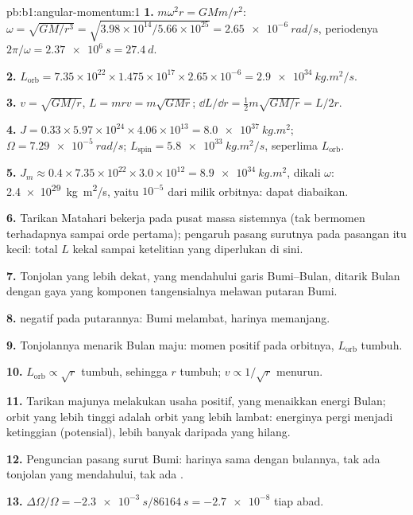 \begin{solution}{pb:b1:angular-momentum:1}
\textbf{1.} $m\omega^2r = GMm/r^2$: $\omega = \sqrt{GM/r^3} = \sqrt{3.98\times
10^{14}/5.66\times10^{25}} = \qty{2.65e-6}{rad/s}$, periodenya $2\pi/\omega =
\qty{2.37e6}{s} = \qty{27.4}{d}$.

\textbf{2.} $L_{\text{orb}} = 7.35\times10^{22} \times 1.475\times10^{17}
\times 2.65\times10^{-6} = \qty{2.9e34}{kg.m^2/s}$.

\textbf{3.} $v = \sqrt{GM/r}$, $L = mrv = m\sqrt{GMr}$; $\dd L/\dd r =
\tfrac12 m\sqrt{GM/r} = L/2r$.

\textbf{4.} $J = 0.33 \times 5.97\times10^{24} \times 4.06\times10^{13} =
\qty{8.0e37}{kg.m^2}$; $\Omega = \qty{7.29e-5}{rad/s}$; $L_{\text{spin}} =
\qty{5.8e33}{kg.m^2/s}$, seperlima $L_{\text{orb}}$.

\textbf{5.} $J_m \approx 0.4 \times 7.35\times10^{22} \times 3.0\times10^{12} =
\qty{8.9e34}{kg.m^2}$, dikali $\omega$: \qty{2.4e29}{kg.m^2/s}, yaitu $10^{-5}$
dari milik orbitnya: dapat diabaikan.

\textbf{6.} Tarikan Matahari bekerja pada pusat massa sistemnya (tak
bermomen terhadapnya sampai orde pertama); pengaruh pasang surutnya pada
pasangan itu kecil: total $L$ kekal sampai ketelitian yang diperlukan di sini.

\textbf{7.} Tonjolan yang lebih dekat, yang mendahului garis Bumi--Bulan,
ditarik Bulan dengan gaya yang komponen tangensialnya melawan putaran Bumi.

\textbf{8.}  negatif pada putarannya: Bumi melambat, harinya memanjang.

\textbf{9.} Tonjolannya menarik Bulan maju: momen positif pada orbitnya,
$L_{\text{orb}}$ tumbuh.

\textbf{10.} $L_{\text{orb}} \propto \sqrt r$ tumbuh, sehingga $r$ tumbuh; $v \propto
1/\sqrt r$ menurun.

\textbf{11.} Tarikan majunya melakukan usaha positif, yang menaikkan
energi Bulan; orbit yang lebih tinggi adalah orbit yang lebih lambat:
energinya pergi menjadi ketinggian (potensial), lebih banyak daripada
 yang hilang.

\textbf{12.} Penguncian pasang surut Bumi: harinya sama dengan bulannya,
tak ada tonjolan yang mendahului, tak ada .

\textbf{13.} $\Delta\Omega/\Omega = -\qty{2.3e-3}{s}/\qty{86164}{s} =
\num{-2.7e-8}$ tiap abad.


\end{solution}

